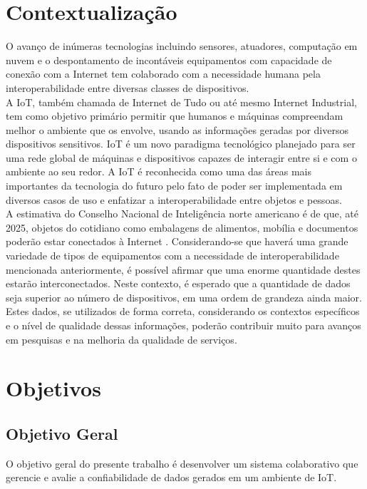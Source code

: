 \section{Contextualização}
\qquad
O avanço de inúmeras tecnologias incluindo sensores, atuadores, computação em nuvem e o despontamento de
incontáveis equipamentos com capacidade de conexão com a Internet tem colaborado com a necessidade humana pela interoperabilidade entre diversas classes de dispositivos.
\\ \null
\qquad
A \acrfull{IoT}, também chamada de Internet de Tudo ou até mesmo Internet Industrial, tem como objetivo primário %
permitir que humanos e máquinas compreendam melhor o ambiente que os envolve, usando as informações geradas por
diversos dispositivos sensitivos. \acrshort{IoT} é um novo paradigma tecnológico planejado para ser uma rede %
global de máquinas e dispositivos capazes de interagir entre si e com o ambiente ao seu redor.
A \acrshort{IoT} é reconhecida como uma das áreas mais importantes da tecnologia do futuro pelo fato de %
poder ser implementada em diversos casos de uso e enfatizar a interoperabilidade entre objetos e pessoas.
\\ \null
\qquad A estimativa do Conselho Nacional de Inteligência norte americano é de que, até 2025, objetos do cotidiano como embalagens de alimentos, mobília e documentos
poderão estar conectados à Internet \cite{intelsix}. Considerando-se que haverá uma grande variedade de tipos de equipamentos com a necessidade de interoperabilidade mencionada anteriormente, %
é possível afirmar que uma enorme quantidade destes estarão interconectados. Neste contexto, %
é esperado que a quantidade de dados seja superior ao número de dispositivos, em uma ordem de grandeza ainda maior.
Estes dados, se utilizados de forma correta, considerando os contextos específicos e o nível de qualidade dessas informações, poderão
contribuir muito para avanços em pesquisas e na melhoria da qualidade de serviços.
\section{Objetivos}
\subsection{Objetivo Geral}
\qquad O objetivo geral do presente trabalho é desenvolver um sistema colaborativo que gerencie e avalie a confiabilidade de dados
gerados em um ambiente de \acrlong{IoT}.
